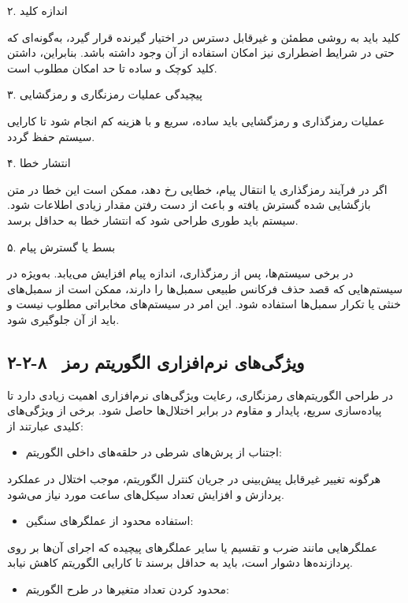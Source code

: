 ۲. اندازه کلید

کلید باید به روشی مطمئن و غیرقابل دسترس در اختیار گیرنده قرار گیرد، به‌گونه‌ای که حتی در شرایط اضطراری نیز امکان استفاده از آن وجود داشته باشد. بنابراین، داشتن کلید کوچک و ساده تا حد امکان مطلوب است.

۳. پیچیدگی عملیات رمزنگاری و رمزگشایی

عملیات رمزگذاری و رمزگشایی باید ساده، سریع و با هزینه کم انجام شود تا کارایی سیستم حفظ گردد.

۴. انتشار خطا

اگر در فرآیند رمزگذاری یا انتقال پیام، خطایی رخ دهد، ممکن است این خطا در متن بازگشایی شده گسترش یافته و باعث از دست رفتن مقدار زیادی اطلاعات شود. سیستم باید طوری طراحی شود که انتشار خطا به حداقل برسد.

۵. بسط یا گسترش پیام

در برخی سیستم‌ها، پس از رمزگذاری، اندازه پیام افزایش می‌یابد. به‌ویژه در سیستم‌هایی که قصد حذف فرکانس طبیعی سمبل‌ها را دارند، ممکن است از سمبل‌های خنثی یا تکرار سمبل‌ها استفاده شود. این امر در سیستم‌های مخابراتی مطلوب نیست و باید از آن جلوگیری شود.

\subsection{۲-۲-۸  ویژگی‌های نرم‌افزاری الگوریتم رمز}

در طراحی الگوریتم‌های رمزنگاری، رعایت ویژگی‌های نرم‌افزاری اهمیت زیادی دارد تا پیاده‌سازی سریع، پایدار و مقاوم در برابر اختلال‌ها حاصل شود. برخی از ویژگی‌های کلیدی عبارتند از\cite{ref38}:

\begin{itemize}
    \item اجتناب از پرش‌های شرطی در حلقه‌های داخلی الگوریتم:
\end{itemize}

هرگونه تغییر غیرقابل پیش‌بینی در جریان کنترل الگوریتم، موجب اختلال در عملکرد پردازش و افزایش تعداد سیکل‌های ساعت مورد نیاز می‌شود.

\begin{itemize}
    \item استفاده محدود از عملگرهای سنگین:
\end{itemize}

عملگرهایی مانند ضرب و تقسیم یا سایر عملگرهای پیچیده که اجرای آن‌ها بر روی پردازنده‌ها دشوار است، باید به حداقل برسند تا کارایی الگوریتم کاهش نیابد.

\begin{itemize}
    \item محدود کردن تعداد متغیرها در طرح الگوریتم:
\end{itemize}

